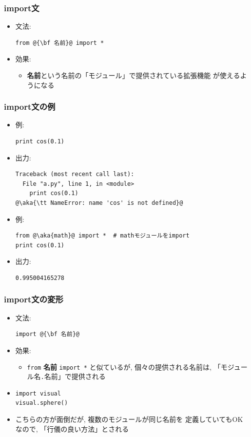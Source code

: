 \documentclass[10pt,dvipdfmx]{beamer}
\newcommand{\aka}[1]{{\color{red}#1}}
\begin{document}
\iffalse


\begin{frame}[fragile]
\frametitle{import文}
\begin{itemize}
\item 文法:
\begin{lstlisting}
from @{\bf 名前}@ import *
\end{lstlisting}
\item 効果:
  \begin{itemize}
  \item {\bf 名前}という名前の「モジュール」で提供されている拡張機能
    が使えるようになる
  \end{itemize}
\end{itemize}
\end{frame}

\begin{frame}[fragile]
\frametitle{import文の例}
\begin{itemize}
\item 例:
\begin{lstlisting}
print cos(0.1)
\end{lstlisting}
\item 出力:
\begin{lstlisting}
Traceback (most recent call last):
  File "a.py", line 1, in <module>
    print cos(0.1)
@\aka{\tt NameError: name 'cos' is not defined}@
\end{lstlisting}
\item 例:
\begin{lstlisting}
from @\aka{math}@ import *  # mathモジュールをimport
print cos(0.1)
\end{lstlisting}
\item 出力:
\begin{lstlisting}
0.995004165278
\end{lstlisting}
\end{itemize}
\end{frame}



\begin{frame}[fragile]
\frametitle{import文の変形}
\begin{itemize}
\item 文法:
\begin{lstlisting}
import @{\bf 名前}@
\end{lstlisting}
\item 効果:
  \begin{itemize}
  \item {\tt from} {\bf 名前} {\tt import *} と似ているが,
    個々の提供される名前は, 「モジュール名{\tt .}名前」で提供される
  \end{itemize}
\item 
\begin{lstlisting}
import visual
visual.sphere()
\end{lstlisting}
\item こちらの方が面倒だが, 複数のモジュールが同じ名前を
定義していてもOKなので, 「行儀の良い方法」とされる
\end{itemize}
\end{frame}
\end{document}
